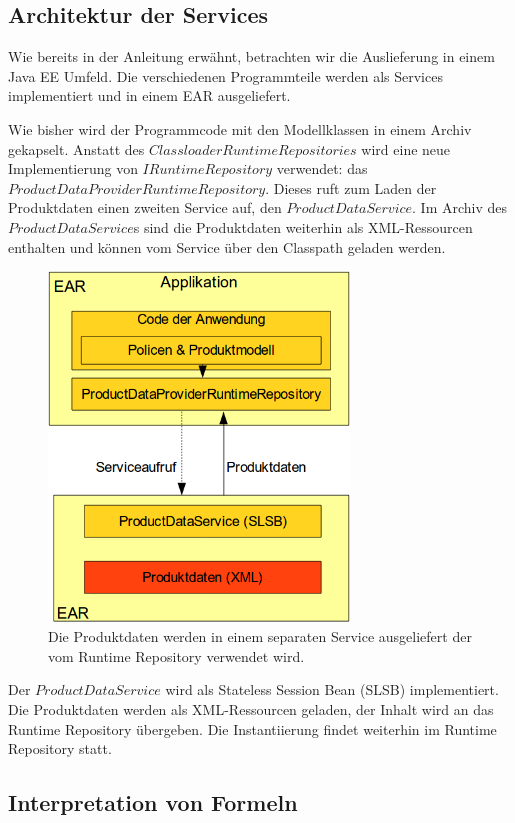 \documentclass[headsepline=true, footsepline=true]{scrartcl}
\begin{document}
\subsection{Architektur der Services}

Wie bereits in der Anleitung erwähnt, betrachten wir die Auslieferung in einem
Java EE Umfeld. Die verschiedenen Programmteile werden als Services
implementiert und in einem EAR ausgeliefert.

Wie bisher wird der Programmcode mit den Modellklassen in einem Archiv gekapselt.
Anstatt des $ClassloaderRuntimeRepositories$ wird eine neue Implementierung von
$IRuntimeRepository$ verwendet: das $ProductDataProviderRuntimeRepository$.
Dieses ruft zum Laden der Produktdaten einen zweiten Service auf, den
$ProductDataService$. Im Archiv des $ProductDataService$s sind die Produktdaten
weiterhin als XML-Ressourcen enthalten und können vom Service über den Classpath
geladen werden.

\begin{figure}[htb] \centering
\includegraphics[width=8cm]{./pics/service_architecture.png}
\caption{Die Produktdaten werden in einem separaten Service ausgeliefert der
vom Runtime Repository verwendet wird.}
\label{service_architecture}
\end{figure}

Der $ProductDataService$ wird als Stateless Session Bean (SLSB) implementiert.
Die Produktdaten werden als XML-Ressourcen geladen, der Inhalt wird an das
Runtime Repository übergeben. Die Instantiierung findet weiterhin im Runtime
Repository statt.

\subsection{Interpretation von Formeln}
\end{document}
